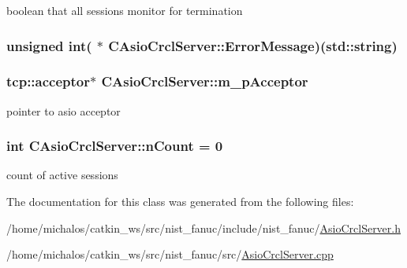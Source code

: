 boolean that all sessions monitor for termination \hypertarget{classCAsioCrclServer_a705b81d958ac4521f086761c30a9eda8}{
\subsubsection[{Error\-Message}]{\setlength{\rightskip}{0pt plus 5cm}unsigned int( $\ast$ C\-Asio\-Crcl\-Server\-::\-Error\-Message)(std\-::string)}}\label{classCAsioCrclServer_a705b81d958ac4521f086761c30a9eda8}
\hypertarget{classCAsioCrclServer_a3683f25664211e9bd73bdfb6dfe68f00}{
\subsubsection[{m\-\_\-p\-Acceptor}]{\setlength{\rightskip}{0pt plus 5cm}tcp\-::acceptor$\ast$ C\-Asio\-Crcl\-Server\-::m\-\_\-p\-Acceptor}}\label{classCAsioCrclServer_a3683f25664211e9bd73bdfb6dfe68f00}
pointer to asio acceptor \hypertarget{classCAsioCrclServer_ac5689559a71c457e5b397719d7dd11b6}{
\subsubsection[{n\-Count}]{\setlength{\rightskip}{0pt plus 5cm}int C\-Asio\-Crcl\-Server\-::n\-Count = 0\hspace{0.3cm}{\ttfamily [static]}}}\label{classCAsioCrclServer_ac5689559a71c457e5b397719d7dd11b6}
count of active sessions 

The documentation for this class was generated from the following files\-:\begin{DoxyCompactItemize}
\item 
/home/michalos/catkin\-\_\-ws/src/nist\-\_\-fanuc/include/nist\-\_\-fanuc/\hyperlink{AsioCrclServer_8h}{Asio\-Crcl\-Server.\-h}\item 
/home/michalos/catkin\-\_\-ws/src/nist\-\_\-fanuc/src/\hyperlink{AsioCrclServer_8cpp}{Asio\-Crcl\-Server.\-cpp}\end{DoxyCompactItemize}
